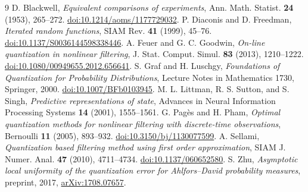 \begin{thebibliography}{9}
 D. Blackwell, \emph{Equivalent comparisons of experiments}, Ann. Math. Statist. \textbf{24} (1953), 265--272. \href{https://doi.org/10.1214/aoms/1177729032}{doi:10.1214/aoms/1177729032}.
 P. Diaconis and D. Freedman, \emph{Iterated random functions}, SIAM Rev. \textbf{41} (1999), 45--76. \href{https://doi.org/10.1137/S0036144598338446}{doi:10.1137/S0036144598338446}.
 A. Feuer and G. C. Goodwin, \emph{On-line quantization in nonlinear filtering}, J. Stat. Comput. Simul. \textbf{83} (2013), 1210--1222. \href{https://doi.org/10.1080/00949655.2012.656641}{doi:10.1080/00949655.2012.656641}.
 S. Graf and H. Luschgy, \emph{Foundations of Quantization for Probability Distributions}, Lecture Notes in Mathematics 1730, Springer, 2000. \href{https://doi.org/10.1007/BFb0103945}{doi:10.1007/BFb0103945}.
 M. L. Littman, R. S. Sutton, and S. Singh, \emph{Predictive representations of state}, Advances in Neural Information Processing Systems \textbf{14} (2001), 1555--1561.
 G. Pag\`es and H. Pham, \emph{Optimal quantization methods for nonlinear filtering with discrete-time observations}, Bernoulli \textbf{11} (2005), 893--932. \href{https://doi.org/10.3150/bj/1130077599}{doi:10.3150/bj/1130077599}.
 A. Sellami, \emph{Quantization based filtering method using first order approximation}, SIAM J. Numer. Anal. \textbf{47} (2010), 4711--4734. \href{https://doi.org/10.1137/060652580}{doi:10.1137/060652580}.
 S. Zhu, \emph{Asymptotic local uniformity of the quantization error for Ahlfors--David probability measures}, preprint, 2017, \href{https://arxiv.org/abs/1708.07657}{arXiv:1708.07657}.
\end{thebibliography}
